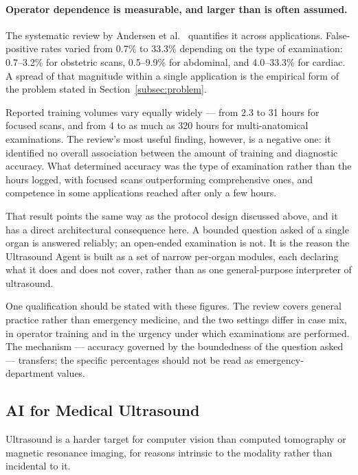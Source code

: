 \paragraph{Operator dependence is measurable, and larger than is often assumed.} The
systematic review by Andersen et al.\ \cite{andersen2019pocus} quantifies it across
applications. False-positive rates varied from 0.7\% to 33.3\% depending on the type of
examination: 0.7--3.2\% for obstetric scans, 0.5--9.9\% for abdominal, and 4.0--33.3\% for
cardiac. A spread of that magnitude within a single application is the empirical form of
the problem stated in Section~\ref{subsec:problem}.

Reported training volumes vary equally widely --- from 2.3 to 31 hours for focused scans,
and from 4 to as much as 320 hours for multi-anatomical examinations. The review's most
useful finding, however, is a negative one: it identified no overall association between
the amount of training and diagnostic accuracy. What determined accuracy was the type of
examination rather than the hours logged, with focused scans outperforming comprehensive
ones, and competence in some applications reached after only a few hours.

That result points the same way as the protocol design discussed above, and it has a direct
architectural consequence here. A bounded question asked of a single organ is answered
reliably; an open-ended examination is not. It is the reason the Ultrasound Agent is built
as a set of narrow per-organ modules, each declaring what it does and does not cover,
rather than as one general-purpose interpreter of ultrasound.

One qualification should be stated with these figures. The review covers general practice
rather than emergency medicine, and the two settings differ in case mix, in operator
training and in the urgency under which examinations are performed. The mechanism ---
accuracy governed by the boundedness of the question asked --- transfers; the specific
percentages should not be read as emergency-department values.

\subsection{AI for Medical Ultrasound}
\label{subsec:sota-ai-us}

Ultrasound is a harder target for computer vision than computed tomography or magnetic
resonance imaging, for reasons intrinsic to the modality rather than incidental to it.

